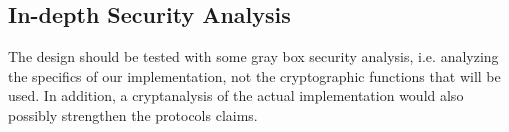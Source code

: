 \subsection{In-depth Security Analysis}
The design should be tested with some gray box security analysis, i.e. analyzing the specifics of our implementation, not the cryptographic functions that will be used. In addition, a cryptanalysis of the actual implementation would also possibly strengthen the protocols claims.
